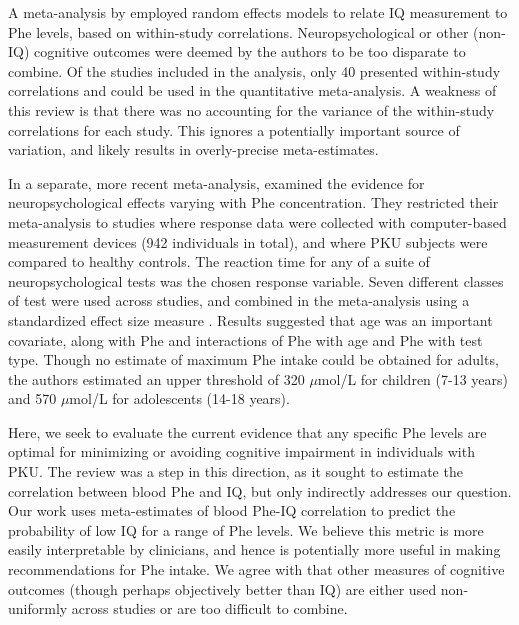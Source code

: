 \documentclass{svjour3}                     %
\begin{document}
A meta-analysis by \citet{Waisbren:2007es} employed random effects models \citep{DerSimonian:1986wm} to relate IQ measurement to Phe levels, based on within-study correlations. Neuropsychological or other (non-IQ) cognitive outcomes were deemed by the authors to be too disparate to combine. Of the studies included in the analysis, only 40 presented within-study correlations and could be used in the quantitative meta-analysis. A weakness of this review is that there was no accounting for the variance of the within-study correlations for each study. This ignores a potentially important source of variation, and likely results in overly-precise meta-estimates.

In a separate, more recent meta-analysis, \citet{Albrecht:2009fb} examined the evidence for neuropsychological effects varying with Phe concentration. They restricted their meta-analysis to studies where response data were collected with computer-based measurement devices (942 individuals in total), and where PKU subjects were compared to healthy controls. The reaction time for any of a suite of neuropsychological tests was the chosen response variable. Seven different classes of test were used across studies, and combined in the meta-analysis using a standardized effect size measure \citep{Rosenthal:1994vc}. Results suggested that age was an important covariate, along with Phe and interactions of Phe with age and Phe with test type. Though no estimate of maximum Phe intake could be obtained for adults, the authors estimated an upper threshold of 320 $\mu$mol/L for children (7-13 years) and 570 $\mu$mol/L for adolescents (14-18 years).

Here, we seek to evaluate the current evidence that any specific Phe levels are optimal for minimizing or avoiding cognitive impairment in individuals with PKU. The \citet{Waisbren:2007es} review was a step in this direction, as it sought to estimate the correlation between blood Phe and IQ, but only indirectly addresses our question. Our work uses meta-estimates of blood Phe-IQ correlation to predict the probability of low IQ for a range of Phe levels. We believe this metric is more easily interpretable by clinicians, and hence is potentially more useful in making recommendations for Phe intake. We agree with \citet{Waisbren:2007es} that other measures of cognitive outcomes (though perhaps objectively better than IQ) are either used non-uniformly across studies or are too difficult to combine.

\end{document}
